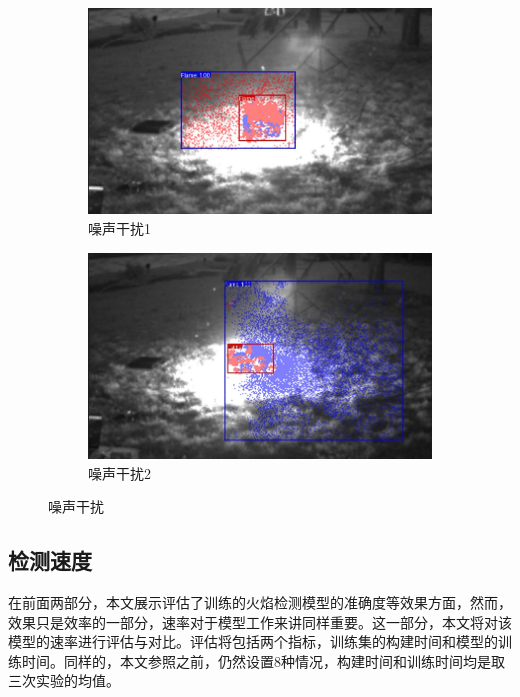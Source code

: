 \begin{figure}[ht]
    \centering
    \begin{subfigure}{0.49\textwidth}
        \centering
        \includegraphics[width=\textwidth]{figures/zaoshen1.png}
        \caption{噪声干扰1}
        \label{24.a}
    \end{subfigure}
    \hfill
    \begin{subfigure}{0.49\textwidth}
        \centering
        \includegraphics[width=\textwidth]{figures/zaosheng2.png}
        \caption{噪声干扰2}
        \label{24.b}
    \end{subfigure}
    \caption{噪声干扰}
    \label{24}
\end{figure}


\subsection{检测速度}
在前面两部分，本文展示评估了训练的火焰检测模型的准确度等效果方面，然而，效果只是效率的一部分，速率对于模型工作来讲同样重要。这一部分，本文将对该模型的速率进行评估与对比。评估将包括两个指标，训练集的构建时间和模型的训练时间。同样的，本文参照之前，仍然设置8种情况，构建时间和训练时间均是取三次实验的均值。

